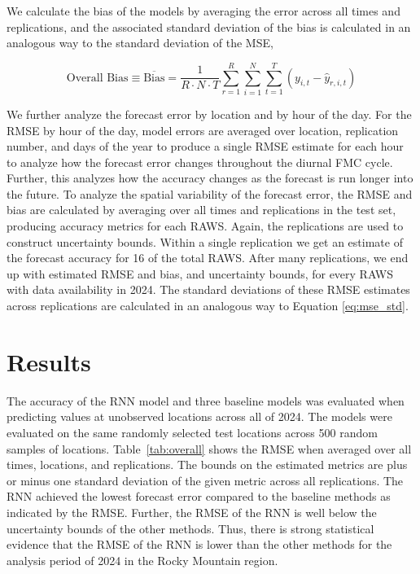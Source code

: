 \documentclass[fire,article,submit,pdftex,moreauthors]{Definitions/mdpi}
\begin{document}
We calculate the bias of the models by averaging the error across all times and replications, and the associated standard deviation of the bias is calculated in an analogous way to the standard deviation of the MSE,
\begin{linenomath}
\begin{equation}
\label{eq:bias}
    \text{Overall Bias} \equiv \overline{\text{Bias}} = \frac{1}{R\cdot N\cdot T}\sum_{r=1}^R\sum_{i=1}^{N} \sum_{t=1}^{T} (y_{i, t} - \hat y_{r, i, t})
\end{equation}
\end{linenomath}

We further analyze the forecast error by location and by hour of the day. For the RMSE by hour of the day, model errors are averaged over location, replication number, and days of the year to produce a single RMSE estimate for each hour to analyze how the forecast error changes throughout the diurnal FMC cycle. Further, this analyzes how the accuracy changes as the forecast is run longer into the future. To analyze the spatial variability of the forecast error, the RMSE and bias are calculated by averaging over all times and replications in the test set, producing accuracy metrics for each RAWS. Again, the replications are used to construct uncertainty bounds. Within a single replication we get an estimate of the forecast accuracy for 16 of the total RAWS. After many replications, we end up with estimated RMSE and bias, and uncertainty bounds, for every RAWS with data availability in 2024. The standard deviations of these RMSE estimates across replications are calculated in an analogous way to Equation \ref{eq:mse_std}.  

\section{Results}
\label{sec:results}

The accuracy of the RNN model and three baseline models was evaluated when predicting values at unobserved locations across all of 2024. The models were evaluated on the same randomly selected test locations across 500 random samples of locations. Table~\ref{tab:overall} shows the RMSE when averaged over all times, locations, and replications. The bounds on the estimated metrics are plus or minus one standard deviation of the given metric across all replications. The RNN achieved the lowest forecast error compared to the baseline methods as indicated by the RMSE. Further, the RMSE of the RNN is well below the uncertainty bounds of the other methods. Thus, there is strong statistical evidence that the RMSE of the RNN is lower than the other methods for the analysis period of 2024 in the Rocky Mountain region. 
\end{document}
